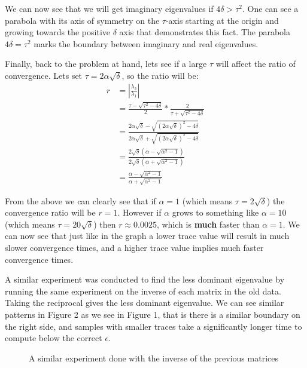 \documentclass{article}
\begin{document}
We can now see that we will get imaginary eigenvalues if $4\delta > \tau^2$.
One can see a parabola with its axis of symmetry on the $\tau$-axis starting at the
origin and growing towards the positive $\delta$ axis that demonstrates this fact.
The parabola $4\delta = \tau^2$ marks the boundary between imaginary and real eigenvalues.

Finally, back to the problem at hand, lets see if a large $\tau$ will affect the ratio
of convergence. Lets set $\tau = 2\alpha\sqrt{\delta}$, so the ratio will be:
\begin{align}
    r &= \left| \frac{\lambda_2}{\lambda_1} \right| \\
      &= \frac{\tau - \sqrt{\tau^2 - 4\delta}}{2} * \frac{2}{\tau + \sqrt{\tau^2 - 4\delta}} \\
      &= \frac{2\alpha\sqrt{\delta} - \sqrt{(2\alpha\sqrt{\delta})^2 - 4\delta}}{2\alpha\sqrt{\delta} + \sqrt{(2\alpha\sqrt{\delta})^2 - 4\delta}} \\
      &= \frac{ 2\sqrt{\delta} (\alpha - \sqrt{\alpha^2 - 1}) }{2\sqrt{\delta} (\alpha + \sqrt{\alpha^2 - 1})} \\
      &= \frac{ \alpha - \sqrt{\alpha^2 - 1} }{\alpha + \sqrt{\alpha^2 - 1}}
\end{align}

From the above we can clearly see that if $\alpha = 1$ (which means $\tau = 2\sqrt{\delta}$)
the convergence ratio will be $r = 1$. However if $\alpha$ grows to something like
$\alpha = 10$ (which means $\tau = 20\sqrt{\delta}$) then
$r \approx 0.0025$, which is \textbf{much} faster than $\alpha = 1$.
We can now see that just like in the graph a lower trace value will result in much slower
convergence times, and a higher trace value implies much faster convergence times.

A similar experiment was conducted to find the less dominant eigenvalue by running the
same experiment on the inverse of each matrix in the old data.
Taking the reciprocal gives the less dominant eigenvalue.
We can see similar patterns in Figure 2 as we see in Figure 1,
that is there is a similar boundary on the right side, and samples with smaller traces
take a significantly longer time to compute below the correct $\epsilon$.

\begin{figure}[h]
    \centering
    
    \caption{A similar experiment done with the inverse of the previous matrices}
\end{figure}
\end{document}

